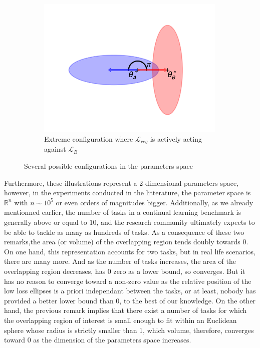 \documentclass[11pt]{article}
\begin{document}
\begin{figure}
\begin{subfigure}[b]{0.3\textwidth}
        \label{fig:two_ellipses_90}
    \end{subfigure}
    \hspace{-0mm}
    \begin{subfigure}[b]{0.3\textwidth}
        \centering
        \includegraphics[width=0.99\textwidth]{images/ellipse_overlap_180.png}
        \caption{Extreme configuration where $\mathcal{L}_{reg}$ is actively acting against $\mathcal{L}_B$}
        \label{fig:two_ellipses_180}
    \end{subfigure}
    \caption{Several possible configurations in the parameters space}
\end{figure}


\vspace{2mm}
\noindent
Furthermore, these illustrations represent a 2-dimensional parameters space, however, in the experiments conducted in the litterature, the parameter space is $\mathbb{R}^n$ with $n \sim 10^5$ or even orders of magnitudes bigger. Additionally, as we already mentionned earlier, the number of tasks in a continual learning benchmark is generally above or equal to $10$, and the research community ultimately expects to be able to tackle as many as hundreds of tasks. As a consequence of these two remarks,the area (or volume) of the overlapping region tends doubly towards 0. On one hand, this representation accounts for two tasks, but in real life scenarios, there are many more. And as the number of tasks increases, the area of the overlapping region decreases, has 0 zero as a lower bound, so converges. But it has no reason to converge toward a non-zero value as the relative position of the low loss ellipses is a priori independant between the tasks, or at least, nobody has provided a better lower bound than 0, to the best of our knowledge. On the other hand, the previous remark implies that there exist a number of tasks for which the overlapping region of interest is small enough to fit within an Euclidean sphere whose radius is strictly smaller than 1, which volume, therefore, converges toward 0 as the dimension of the parameters space increases. 
\end{document}
